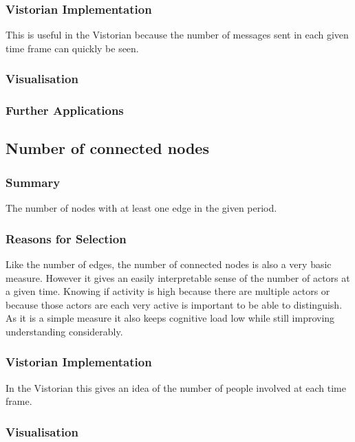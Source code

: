 \subsubsection{Vistorian Implementation}
This is useful in the Vistorian because the number of messages sent in each given time frame can quickly be seen.
\subsubsection{Visualisation}
\subsubsection{Further Applications}


\subsection{Number of connected nodes}
\subsubsection{Summary}
The number of nodes with at least one edge in the given period.

\subsubsection{Reasons for Selection}
Like the number of edges, the number of connected nodes is also a very basic measure. However it gives an easily interpretable sense of the number of actors at a given time. Knowing if activity is high because there are multiple actors or because those actors are each very active is important to be able to distinguish. As it is a simple measure it also keeps cognitive load low while still improving understanding considerably.

\subsubsection{Vistorian Implementation}
In the Vistorian this gives an idea of the number of people involved at each time frame. 

\subsubsection{Visualisation}
